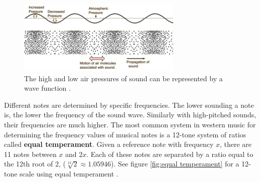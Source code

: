 \documentclass[10pt]{article}
\begin{document}
\begin{figure}[h]
    \centering
    \includegraphics[width=0.7\textwidth]{Sound Waves JPG}
    \caption{The high and low air pressures of sound can be represented by a wave function \cite{nave2017hyperphysics}.} 
    \label{fig:sound wave 1}
\end{figure}

Different notes are determined by specific frequencies. The lower sounding a note is, the lower the frequency of the sound wave. Similarly with high-pitched sounds, their frequencies are much higher. The most common system in western music for determining the frequency values of musical notes is a 12-tone system of ratios called \textbf{equal temperament}. Given a reference note with frequency $x$, there are 11 notes between $x$ and $2x$. Each of these notes are separated by a ratio equal to the 12th root of 2, ($\sqrt[12]{2}\approx1.05946$). See figure \ref{fig:equal temperament} for a 12-tone scale using equal temperament  \cite{tuningSystems} \cite{boatwright1956musictheory}.
\end{document}
